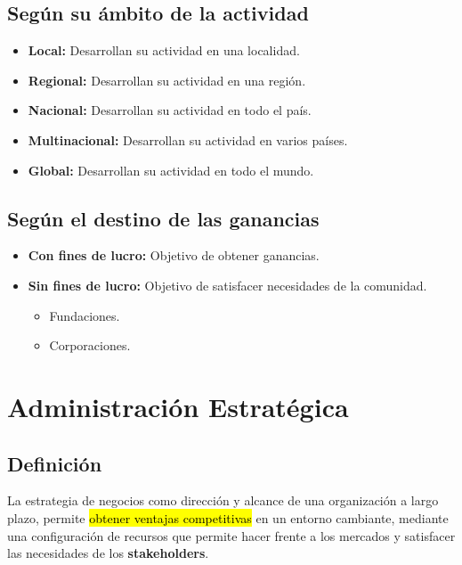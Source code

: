 \documentclass{templateNote}
\newcommand{\hlcolor}[2]{{\sethlcolor{#1}\hl{#2}}}
\begin{document}
\subsection{Seg\'un su \'ambito de la actividad}
\begin{itemize}
    \item \textbf{Local:} Desarrollan su actividad en una localidad.
    
    \item \textbf{Regional:} Desarrollan su actividad en una regi\'on.
    
    \item \textbf{Nacional:} Desarrollan su actividad en todo el pa\'is.
    
    \item \textbf{Multinacional:} Desarrollan su actividad en varios pa\'ises.
    
    \item \textbf{Global:} Desarrollan su actividad en todo el mundo.
\end{itemize}

\subsection{Seg\'un el destino de las ganancias}
\begin{itemize}
    \item \textbf{Con fines de lucro:} Objetivo de obtener ganancias.
    
    \item \textbf{Sin fines de lucro:} Objetivo de satisfacer necesidades de la comunidad.
    \begin{itemize}
        \item Fundaciones.
        
        \item Corporaciones.
    \end{itemize}
\end{itemize}

\newpage
\section{Administraci\'on Estrat\'egica}
\subsection{Definici\'on}
La estrategia de negocios como direcci\'on y alcance de una organizaci\'on a largo plazo, permite \hlcolor{orange!50}{obtener ventajas competitivas} en un entorno cambiante, mediante una configuraci\'on de recursos que permite hacer frente a los mercados y satisfacer las necesidades de los \textbf{stakeholders}.
\end{document}
